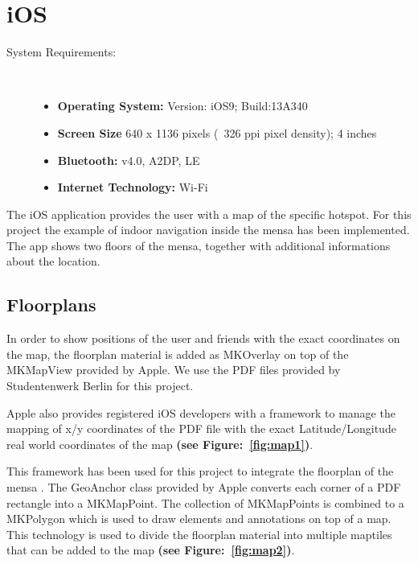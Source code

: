 \vspace{0.5cm}

\section{iOS}

\begin{description}
\item[System Requirements:] \hfill \\
\begin{itemize}
  \item \textbf{Operating System:} Version: iOS9; Build:13A340
  \item \textbf{Screen Size} 640 x 1136 pixels (~326 ppi pixel density); 4 inches
  \item \textbf{Bluetooth:} v4.0, A2DP, LE
  \item \textbf{Internet Technology:} Wi-Fi
\end{itemize}
\end{description}

The iOS application provides the user with a map of the specific hotspot. For this project the example of indoor navigation inside the mensa has been implemented. The app shows two floors of the mensa, together with additional informations about the location.

\subsection{Floorplans}
In order to show positions of the user and friends with the exact coordinates on the map, the floorplan material is added as MKOverlay on top of the MKMapView provided by Apple. We use the PDF files provided by Studentenwerk Berlin for this project.

Apple also provides registered iOS developers with a framework to manage the mapping of x/y coordinates of the PDF file with the exact Latitude/Longitude real world coordinates of the map
\textbf{(see Figure:~\ref{fig:map1})}.

This framework has been used for this project to integrate the floorplan of the mensa \cite{AppleFootprint}. The GeoAnchor class provided by Apple converts each corner of a PDF rectangle into a MKMapPoint. The collection of MKMapPoints is combined to a MKPolygon which is used to draw elements and annotations on top of a map. This technology is used to divide the floorplan material into multiple maptiles that can be added to the map \textbf{(see Figure:~\ref{fig:map2})}.


